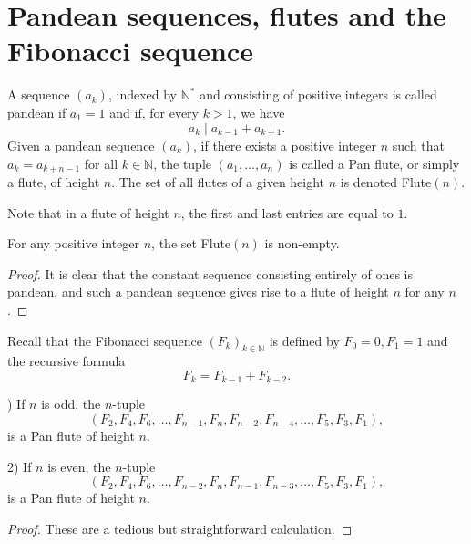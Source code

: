 
\chapter{Pandean sequences, flutes and the Fibonacci sequence}
\begin{definition}
    \label{def:flute}
    \leanok
    A sequence $(a_k)$, indexed by $\mathbb{N}^*$ and consisting of positive integers is called pandean if $a_1 = 1$ and 
    if, for every $k > 1$, we have
    \[
        a_k \mid a_{k-1} + a_{k+1}.
    \]
    Given a pandean sequence $(a_k)$, if there exists a positive integer $n$ such that $a_k = a_{k+n-1}$ for all $k\in \mathbb{N}$, 
    the tuple $(a_1, \ldots, a_n)$ is called a Pan flute, or simply a flute, of height $n$. The set of all flutes of a given height $n$ 
    is denoted Flute$(n)$.
\end{definition}
Note that in a flute of height $n$, the first and last entries are equal to $1$. 
\begin{lemma}
    \label{l:nFluteNonEmpty}
    \leanok
    For any positive integer $n$, the set Flute$(n)$ is non-empty.
\end{lemma}
\begin{proof}
    \leanok
    It is clear that the constant sequence consisting 
    entirely of ones is pandean, and such a pandean sequence gives rise to a flute of height $n$ for any $n$.
\end{proof}
Recall that the Fibonacci sequence $(F_k)_{k \in \mathbb{N}}$ is defined by $F_0 = 0, F_1 = 1$ and the recursive formula
    \[
        F_k = F_{k-1} + F_{k-2}.
    \]


\begin{lemma}
    \label{l:FibFlute}
    ) If $n$ is odd, the $n$-tuple 
    \[
        (F_2,F_4, F_6, \ldots, F_{n-1}, F_{n}, F_{n-2}, F_{n-4}, \ldots, F_5, F_3, F_1), 
    \]
    is a Pan flute of height $n$.

    2) If $n$ is even, the $n$-tuple 
    \[
        (F_2, F_4, F_6, \ldots, F_{n-2}, F_{n}, F_{n-1}, F_{n-3}, \ldots, F_5, F_3,F_1),
    \]
    is a Pan flute of height $n$. 
\end{lemma}
\begin{proof}\leanok
    These are a tedious but straightforward calculation.
\end{proof}

